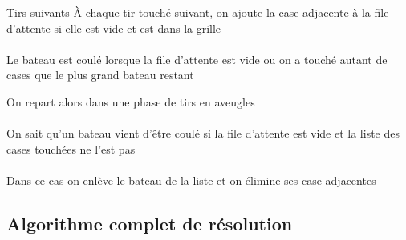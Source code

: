 \begin{frame}{Tirs suivants}
À chaque tir touché suivant, on ajoute la case adjacente à la file d'attente si elle est vide et est dans la grille\\~\\ \pause
Le bateau est coulé lorsque la file d'attente est vide ou on a touché autant de cases que le plus grand bateau restant 
\end{frame}

\begin{frame}
On repart alors dans une phase de tirs en aveugles\\~\\ \pause
On sait qu'un bateau vient d'être coulé si la file d'attente est vide et la liste des cases touchées ne l'est pas\\~\\ \pause
Dans ce cas on enlève le bateau de la liste et on élimine ses case adjacentes
\end{frame}

\subsection{Algorithme complet de résolution}

